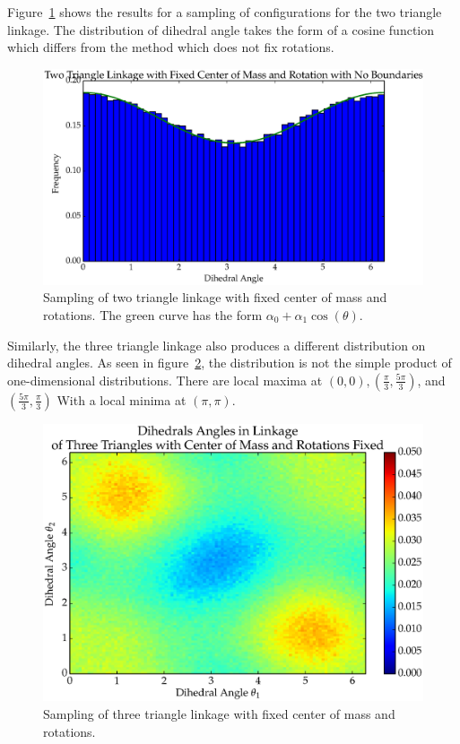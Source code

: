 Figure~\ref{fig:T2_5} shows the results for a sampling of configurations for the two triangle linkage. The distribution of dihedral angle takes the form of a cosine function which differs from the method which does not fix rotations. 
\begin{figure}[ht]
\centering
  \includegraphics[scale=0.6]{images/T2_5.eps}
\caption{Sampling of two triangle linkage with fixed center of mass and rotations. The green curve has the form $\alpha_0 + \alpha_1\cos(\theta)$.}
\label{fig:T2_5}
\end{figure}
Similarly, the three triangle linkage also produces a different distribution on dihedral angles. As seen in figure~\ref{fig:T3_6}, the distribution is not the simple product of one-dimensional distributions. There are local maxima at $(0,0), (\frac{\pi}{3}, \frac{5\pi}{3})$, and $(\frac{5\pi}{3}, \frac{\pi}{3})$ With a local minima at $(\pi,\pi)$. 
\begin{figure}[ht]
\centering
  \includegraphics[scale=0.6]{images/T3_6_2D.eps}
\caption{Sampling of three triangle linkage with fixed center of mass and rotations.}
\label{fig:T3_6}
\end{figure} 

